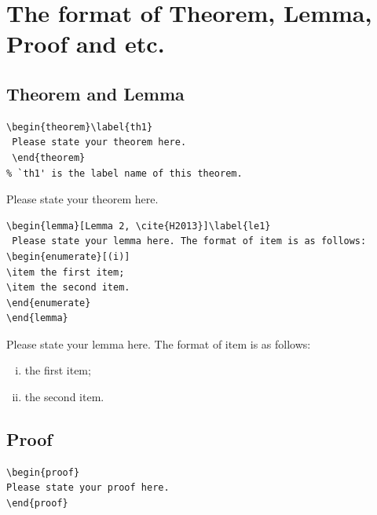 \documentclass{jnma}
\begin{document}
\section{The  format of Theorem, Lemma, Proof and etc.}
\subsection{Theorem and Lemma}
\begin{verbatim}
\begin{theorem}\label{th1}
 Please state your theorem here.
 \end{theorem}
% `th1' is the label name of this theorem.
 \end{verbatim}

 \begin{theorem}\label{th1}
Please state your theorem here.
\end{theorem}

\medskip
{}
\begin{verbatim}
\begin{lemma}[Lemma 2, \cite{H2013}]\label{le1}
 Please state your lemma here. The format of item is as follows:
\begin{enumerate}[(i)]
\item the first item;
\item the second item.
\end{enumerate}
\end{lemma}
 \end{verbatim}

 \begin{lemma}
 \label{le1}
  Please state your lemma here. The format of item is as follows:
\begin{enumerate}[(i)]
\item the first item;
\item the second item.
\end{enumerate}
\end{lemma}

 \subsection{Proof}

\begin{verbatim}
\begin{proof}
Please state your proof here.
\end{proof}
 \end{verbatim}
\end{document}
